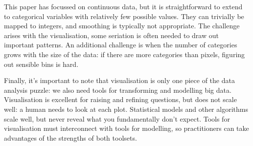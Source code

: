 \documentclass[journal]{vgtc}                %
\begin{document}
This paper has focussed on continuous data, but it is straightforward to extend to categorical variables with relatively few possible values. They can trivially be mapped to integers, and smoothing is typically not appropriate. The challenge arises with the visualisation, some seriation \citep{hahsler:2008} is often needed to draw out important patterns.  An additional challenge is when the number of categories grows with the size of the data: if there are more categories than pixels, figuring out sensible bins is hard.

Finally, it's important to note that visualisation is only one piece of the data analysis puzzle: we also need tools for transforming and modelling big data. Visualisation is excellent for raising and refining questions, but does not scale well: a human needs to look at each plot. Statistical models and other algorithms scale well, but never reveal what you fundamentally don't expect. Tools for visualisation must interconnect with tools for modelling, so practitioners can take advantages of the strengths of both toolsets.





\end{document}
